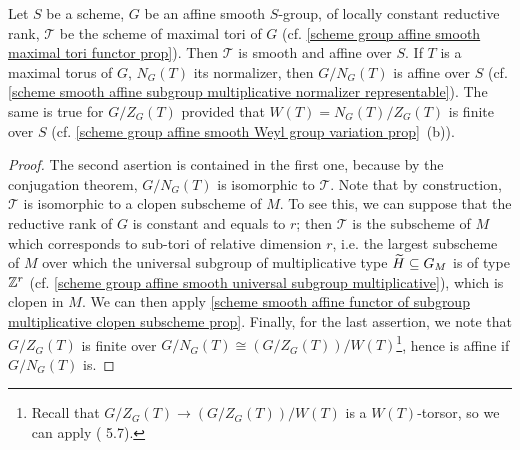 \begin{corollary}\label{scheme smooth affine functor of maximal tori is affine}
Let $S$ be a scheme, $G$ be an affine smooth $S$-group, of locally constant reductive rank, $\mathscr{T}$ be the scheme of maximal tori of $G$ (cf. \cref{scheme group affine smooth maximal tori functor prop}). Then $\mathscr{T}$ is smooth and affine over $S$. If $T$ is a maximal torus of $G$, $N_G(T)$ its normalizer, then $G/N_G(T)$ is affine over $S$ (cf. \cref{scheme smooth affine subgroup multiplicative normalizer representable}). The same is true for $G/Z_G(T)$ provided that $W(T)=N_G(T)/Z_G(T)$ is finite over $S$ (cf. \cref{scheme group affine smooth Weyl group variation prop}~(b)).
\end{corollary}
\begin{proof}
The second asertion is contained in the first one, because by the conjugation theorem, $G/N_G(T)$ is isomorphic to $\mathscr{T}$. Note that by construction, $\mathscr{T}$ is isomorphic to a clopen subscheme of $M$. To see this, we can suppose that the reductive rank of $G$ is constant and equals to $r$; then $\mathscr{T}$ is the subscheme of $M$ which corresponds to sub-tori of relative dimension $r$, i.e. the largest subscheme of $M$ over which the universal subgroup of multiplicative type $\widetilde{H}\subseteq G_M$ is of type $\mathbb{Z}^r$ (cf. \cref{scheme group affine smooth universal subgroup multiplicative}), which is clopen in $M$. We can then apply \cref{scheme smooth affine functor of subgroup multiplicative clopen subscheme prop}. Finally, for the last assertion, we note that $G/Z_G(T)$ is finite over $G/N_G(T)\cong(G/Z_G(T))/W(T)$\footnote{Recall that $G/Z_G(T)\to (G/Z_G(T))/W(T)$ is a $W(T)$-torsor, so we can apply (\cite{SGA1}  5.7).}, hence is affine if $G/N_G(T)$ is.
\end{proof}

